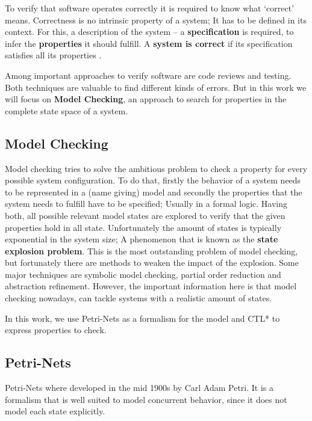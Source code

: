 To verify that software operates correctly it is required to know what `correct' means.
Correctness is no intrinsic property of a system;
It has to be defined in its context.
For this, a description of the system -- a \textbf{specification} is required, to infer the \textbf{properties} it should fulfill.
A \textbf{system is correct} if its specification satisfies all its properties \cite[Chapter 1]{baier2008principles}.

Among important approaches to verify software are code reviews and testing.
Both techniques are valuable to find different kinds of errors.
But in this work we will focus on \textbf{Model Checking}, an approach to search for properties in the complete state space of a system.

\subsection{Model Checking}
Model checking tries to solve the ambitious problem to check a property for every possible system configuration.
To do that, firstly the behavior of a system needs to be represented in a (name giving) model
and secondly the properties that the system needs to fulfill have to be specified;
Usually in a formal logic.
Having both, all possible relevant model states are explored to verify that the given properties hold in all state.
Unfortunately the amount of states is typically exponential in the system size;
A phenomenon that is known as the \textbf{state explosion problem}\cite[Introduction]{mcmillan1993symbolic}.
This is the most outstanding problem of model checking, but fortunately there are methods to weaken the impact of the explosion.
Some major techniques are symbolic model checking, partial order reduction and abstraction refinement\cite[Chapter 5]{clarke2011model}.
However, the important information here is that model checking nowadays, can tackle systems with a realistic amount of states.

In this work, we use Petri-Nets as a formalism for the model and CTL* to express properties to check.

\subsection{Petri-Nets}
\label{rel_petri}
Petri-Nets where developed in the mid 1900s by Carl Adam Petri\cite{petri1962kommunikation}.
It is a formalism that is well suited to model concurrent behavior, since it does not model each state explicitly.

